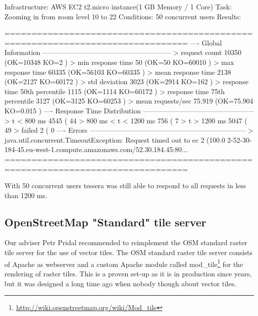 Infrastructure: AWS EC2 t2.micro instance(1 GB Memory / 1 Core)
Task: Zooming in from zoom level 10 to 22
Conditions: 50 concurrent users
Results:
\begin{bashcode}
================================================================================
---- Global Information --------------------------------------------------------
> request count                                      10350 (OK=10348  KO=2     )
> min response time                                     50 (OK=50     KO=60010 )
> max response time                                  60335 (OK=56103  KO=60335 )
> mean response time                                  2138 (OK=2127   KO=60172 )
> std deviation                                       3023 (OK=2914   KO=162   )
> response time 50th percentile                       1115 (OK=1114   KO=60172 )
> response time 75th percentile                       3127 (OK=3125   KO=60253 )
> mean requests/sec                                 75.919 (OK=75.904 KO=0.015 )
---- Response Time Distribution ------------------------------------------------
> t < 800 ms                                          4545 ( 44%
> 800 ms < t < 1200 ms                                 756 (  7%
> t > 1200 ms                                         5047 ( 49%
> failed                                                 2 (  0%
---- Errors --------------------------------------------------------------------
> java.util.concurrent.TimeoutException: Request timed out to ec      2 (100.0%
2-52-30-184-45.eu-west-1.compute.amazonaws.com/52.30.184.45:80...
================================================================================
\end{bashcode}

With 50 concurrent users tessera was still able to respond to all requests in less than 1200 ms.

\subsection{OpenStreetMap "Standard" tile server}
Our adviser Petr Pridal recommended to reimplement the OSM standard raster tile server for the use of vector tiles. The OSM standard raster tile server consists of Apache as webserver and a custom Apache module called mod_tile\footnote{\url{http://wiki.openstreetmap.org/wiki/Mod_tile}} for the rendering of raster tiles. This is a proven set-up as it is in production since years, but it was designed a long time ago when nobody though about vector tiles.

